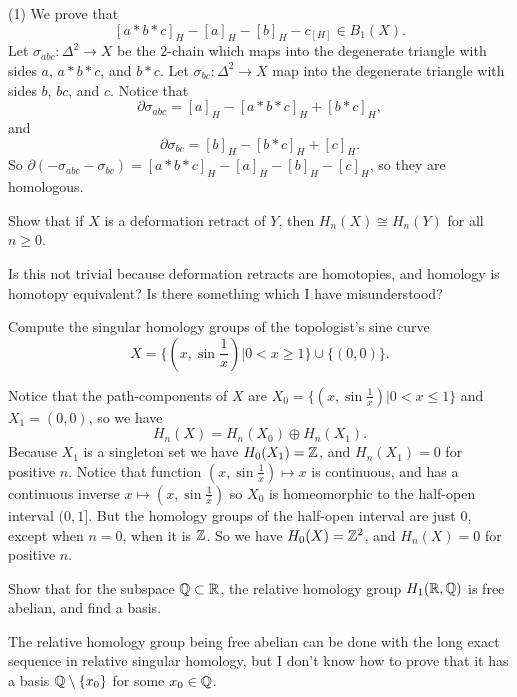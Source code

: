 \documentclass{article}
\begin{document}
\begin{exerciseseries}
\begin{solution*}
		(1) We prove that
		\[[a*b*c]_H-[a]_H-[b]_H-c_[H]\in B_1(X).\]
		Let $\sigma_{abc}:\Delta^2\to X$ be the $2$-chain which maps into the degenerate triangle with sides $a$, $a*b*c$, and $b*c$.
		Let $\sigma_{bc}:\Delta^2\to X$ map into the degenerate triangle with sides $b$, $bc$, and $c$.
		Notice that 
		\[\partial\sigma_{abc}=[a]_H-[a*b*c]_H+[b*c]_H,\]
		and
		\[\partial\sigma_{bc}=[b]_H-[b*c]_H+[c]_H.\]
		So $\partial(-\sigma_{abc}-\sigma_{bc})=[a*b*c]_H-[a]_H-[b]_H-[c]_H$, so they are homologous.
	\end{solution*}
	\exercise Show that if $X$ is a deformation retract of $Y$, then $H_n(X)\cong H_n(Y)$ for all $n\ge 0$.
	\begin{solution*}
		Is this not trivial because deformation retracts are homotopies, and homology is homotopy equivalent?
		Is there something which I have misunderstood?
	\end{solution*}
	\exercise Compute the singular homology groups of the topologist's sine curve
	\[X=\{(x,\sin\frac1x)|0<x\ge 1\}\cup\{(0,0)\}.\]
	\begin{solution*}
		Notice that the path-components of $X$ are $X_0=\{(x,\sin\frac1x)|0<x\le1\}$ and $X_1=(0,0)$, so we have 
		\[H_n(X)=H_n(X_0)\oplus H_n(X_1).\]
		Because $X_1$ is a singleton set we have $H_0(X_1)=\mathbb{Z}$, and $H_n(X_1)=0$ for positive $n$.
		Notice that function $(x,\sin\frac1x)\mapsto x$ is continuous, and has a continuous inverse $x\mapsto(x,\sin\frac1x)$ so $X_0$ is homeomorphic to the half-open interval $(0,1]$.
		But the homology groups of the half-open interval are just $0$, except when $n=0$, when it is $\mathbb{Z}$.
		So we have $H_0(X)=\mathbb{Z}^2$, and $H_n(X)=0$ for positive $n$.
	\end{solution*}
	\exercise Show that for the subspace $\mathbb{Q}\subset\mathbb{R}$, the relative homology group $H_1(\mathbb{R},\mathbb{Q})$ is free abelian, and find a basis.
	\begin{solution*}
		The relative homology group being free abelian can be done with the long exact sequence in relative singular homology, but I don't know how to prove that it has a basis $\mathbb{Q}\setminus\{x_0\}$ for some $x_0\in\mathbb{Q}$.
	\end{solution*}
\end{exerciseseries}
\end{document}
